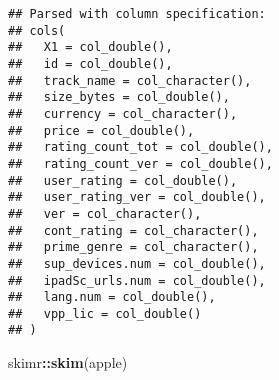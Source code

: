 \documentclass[]{article}
\newenvironment{Shaded}{\begin{snugshade}}{\end{snugshade}}
\newcommand{\KeywordTok}[1]{\textcolor[rgb]{0.13,0.29,0.53}{\textbf{#1}}}
\newcommand{\DataTypeTok}[1]{\textcolor[rgb]{0.13,0.29,0.53}{#1}}
\newcommand{\DecValTok}[1]{\textcolor[rgb]{0.00,0.00,0.81}{#1}}
\newcommand{\FloatTok}[1]{\textcolor[rgb]{0.00,0.00,0.81}{#1}}
\newcommand{\StringTok}[1]{\textcolor[rgb]{0.31,0.60,0.02}{#1}}
\newcommand{\CommentTok}[1]{\textcolor[rgb]{0.56,0.35,0.01}{\textit{#1}}}
\newcommand{\OperatorTok}[1]{\textcolor[rgb]{0.81,0.36,0.00}{\textbf{#1}}}
\newcommand{\NormalTok}[1]{#1}
\begin{document}
\begin{Shaded}
\end{Shaded}

\begin{verbatim}
## Parsed with column specification:
## cols(
##   X1 = col_double(),
##   id = col_double(),
##   track_name = col_character(),
##   size_bytes = col_double(),
##   currency = col_character(),
##   price = col_double(),
##   rating_count_tot = col_double(),
##   rating_count_ver = col_double(),
##   user_rating = col_double(),
##   user_rating_ver = col_double(),
##   ver = col_character(),
##   cont_rating = col_character(),
##   prime_genre = col_character(),
##   sup_devices.num = col_double(),
##   ipadSc_urls.num = col_double(),
##   lang.num = col_double(),
##   vpp_lic = col_double()
## )
\end{verbatim}

\begin{Shaded}
\begin{Highlighting}[]
\NormalTok{skimr}\OperatorTok{::}\KeywordTok{skim}\NormalTok{(apple)}
\end{Highlighting}
\end{Shaded}
\end{document}
